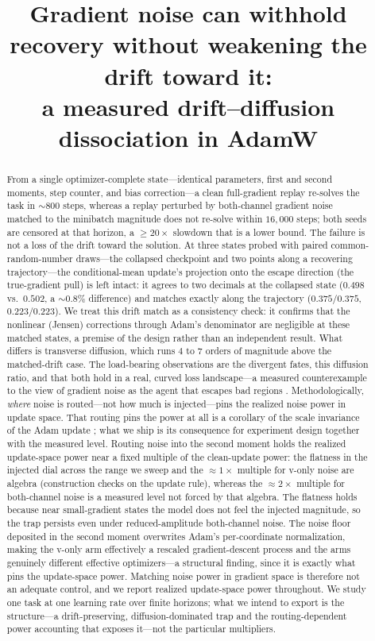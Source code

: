 \title{Gradient noise can withhold recovery without weakening the drift toward it:\\ a measured drift--diffusion dissociation in AdamW}

\begin{abstract}
From a single optimizer-complete state---identical parameters, first and second moments, step counter, and bias correction---a clean full-gradient replay re-solves the task in ${\sim}800$ steps, whereas a replay perturbed by both-channel gradient noise matched to the minibatch magnitude does not re-solve within $16{,}000$ steps; both seeds are censored at that horizon, a ${\geq}20\times$ slowdown that is a lower bound.
The failure is not a loss of the drift toward the solution. At three states probed with paired common-random-number draws---the collapsed checkpoint and two points along a recovering trajectory---the conditional-mean update's projection onto the escape direction (the true-gradient pull) is left intact: it agrees to two decimals at the collapsed state ($0.498$ vs.\ $0.502$, a ${\sim}0.8\%$ difference) and matches exactly along the trajectory ($0.375/0.375$, $0.223/0.223$). We treat this drift match as a consistency check: it confirms that the nonlinear (Jensen) corrections through Adam's denominator are negligible at these matched states, a premise of the design rather than an independent result. What differs is transverse diffusion, which runs $4$ to $7$ orders of magnitude above the matched-drift case. The load-bearing observations are the divergent fates, this diffusion ratio, and that both hold in a real, curved loss landscape---a measured counterexample to the view of gradient noise as the agent that escapes bad regions \citep{saddle,zhu}.
Methodologically, \emph{where} noise is routed---not how much is injected---pins the realized noise power in update space. That routing pins the power at all is a corollary of the scale invariance of the Adam update \citep{adam}; what we ship is its consequence for experiment design together with the measured level. Routing noise into the second moment holds the realized update-space power near a fixed multiple of the clean-update power: the flatness in the injected dial across the range we sweep and the ${\approx}1\times$ multiple for v-only noise are algebra (construction checks on the update rule), whereas the ${\approx}2\times$ multiple for both-channel noise is a measured level not forced by that algebra. The flatness holds because near small-gradient states the model does not feel the injected magnitude, so the trap persists even under reduced-amplitude both-channel noise. The noise floor deposited in the second moment overwrites Adam's per-coordinate normalization, making the v-only arm effectively a rescaled gradient-descent process and the arms genuinely different effective optimizers---a structural finding, since it is exactly what pins the update-space power. Matching noise power in gradient space is therefore not an adequate control, and we report realized update-space power throughout.
We study one task at one learning rate over finite horizons; what we intend to export is the structure---a drift-preserving, diffusion-dominated trap and the routing-dependent power accounting that exposes it---not the particular multipliers.
\end{abstract}